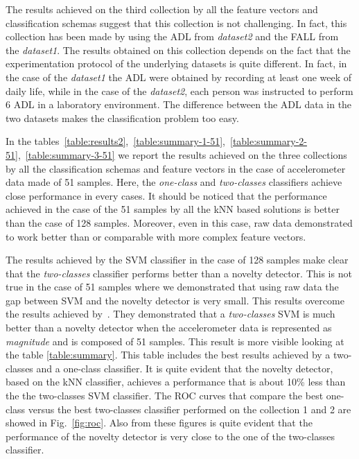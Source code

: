 \documentclass[twocolumn]{svjour3}          \smartqed  \usepackage[draft]{hyperref}
\begin{document}
The results achieved on the third collection by all the feature vectors and classification schemas suggest that this collection is not challenging. In fact, this collection has been made by using the ADL from \emph{dataset2} and the FALL from the \emph{dataset1}. The results obtained on this collection depends on the fact that the experimentation protocol of the underlying datasets is quite different. In fact, in the case of the \emph{dataset1} the ADL were obtained by recording at least one week of daily life, while in the case of the \emph{dataset2}, each person was instructed to perform 6 ADL in a laboratory environment. The difference between the ADL data in the two datasets makes the classification problem too easy.

In the tables~\ref{table:results2},~\ref{table:summary-1-51},~\ref{table:summary-2-51},~\ref{table:summary-3-51} we report the results achieved on the three collections by all the classification schemas and feature vectors in the case of accelerometer data made of 51 samples. Here, the \emph{one-class} and \emph{two-classes} classifiers achieve close performance in every cases. It should be noticed that the performance achieved in the case of the 51 samples by all the kNN based solutions is better than the case of 128 samples.  Moreover, even in this case, raw data demonstrated to work better than or comparable with more complex feature vectors.

The results achieved by the SVM classifier in the case of 128 samples make clear that the \emph{two-classes} classifier performs better than a novelty detector. This is not true in the case of 51 samples where we demonstrated that using raw data the gap between SVM and the novelty detector is very small. This results overcome the results achieved by~\citet{medrano2014}. They demonstrated that  a \emph{two-classes} SVM is much better than a novelty detector when the accelerometer data is represented as \emph{magnitude} and is composed of  51 samples. This result is more visible looking at the table \ref{table:summary}. This table includes the best results achieved by a two-classes and a one-class classifier. It is quite evident that the novelty detector, based on the kNN classifier, achieves a performance that is about 10\% less than the the two-classes SVM classifier. The ROC curves that compare the best one-class versus the best two-classes classifier performed on the collection 1 and 2 are showed in Fig.~\ref{fig:roc}. Also from these figures is quite evident that the performance of the novelty detector is very close to the one of the two-classes classifier. 
\end{document}
